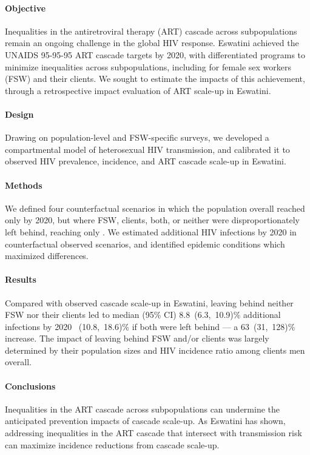 \paragraph{Objective}
Inequalities in the antiretroviral therapy (ART) cascade across subpopulations
remain an ongoing challenge in the global HIV response.
Eswatini achieved the UNAIDS 95-95-95 ART cascade targets by 2020,
with differentiated programs to minimize inequalities across subpopulations,
including for female sex workers (FSW) and their clients.
We sought to estimate the impacts of this achievement,
through a retrospective impact evaluation of ART scale-up in Eswatini.
\paragraph{Design}
Drawing on population-level and FSW-specific surveys,
we developed a compartmental model of heterosexual HIV transmission,
and calibrated it to observed
HIV prevalence, incidence, and ART cascade scale-up in Eswatini.
\paragraph{Methods}
We defined four counterfactual scenarios in which
the population overall reached only \casmd by 2020,
but where FSW, clients, both, or neither
were disproportionately left behind, reaching only \caslo.
We estimated additional HIV infections by 2020
in counterfactual \vs observed scenarios,
and identified epidemic conditions which maximized differences.
\paragraph{Results}
Compared with observed cascade scale-up in Eswatini,
leaving behind neither FSW nor their clients led to median (95\% CI)
8.8~(6.3,~10.9)\% additional infections by 2020 ~(10.8,~18.6)\% if both were left behind %
--- a 63~(31,~128)\% increase. %
The impact of leaving behind FSW and/or clients was largely determined by
their population sizes and HIV incidence ratio among clients \vs men overall.
\paragraph{Conclusions}
Inequalities in the ART cascade across subpopulations
can undermine the anticipated prevention impacts of cascade scale-up.
As Eswatini has shown,
addressing inequalities in the ART cascade that intersect with transmission risk
can maximize incidence reductions from cascade scale-up.
